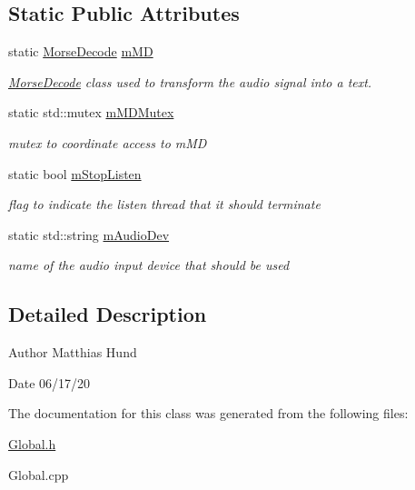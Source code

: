 \subsection*{Static Public Attributes}
\begin{DoxyCompactItemize}
\item 
\mbox{\label{classGlobal_acec01a6570ee9e7fcacb53e34f3e07d9}} 
static \hyperlink{classMorseDecode}{Morse\+Decode} \hyperlink{classGlobal_acec01a6570ee9e7fcacb53e34f3e07d9}{m\+MD}
\begin{DoxyCompactList}\small\item\em \hyperlink{classMorseDecode}{Morse\+Decode} class used to transform the audio signal into a text. \end{DoxyCompactList}\item 
\mbox{\label{classGlobal_a381fdad9f072fbfc884f5fd21770c01d}} 
static std\+::mutex \hyperlink{classGlobal_a381fdad9f072fbfc884f5fd21770c01d}{m\+M\+D\+Mutex}
\begin{DoxyCompactList}\small\item\em mutex to coordinate access to m\+MD \end{DoxyCompactList}\item 
\mbox{\label{classGlobal_a8b6e4fdee334448daa515c479f811c16}} 
static bool \hyperlink{classGlobal_a8b6e4fdee334448daa515c479f811c16}{m\+Stop\+Listen}
\begin{DoxyCompactList}\small\item\em flag to indicate the listen thread that it should terminate \end{DoxyCompactList}\item 
\mbox{\label{classGlobal_af3946aac777799a0d5c1df0a7a5abcdb}} 
static std\+::string \hyperlink{classGlobal_af3946aac777799a0d5c1df0a7a5abcdb}{m\+Audio\+Dev}
\begin{DoxyCompactList}\small\item\em name of the audio input device that should be used \end{DoxyCompactList}\end{DoxyCompactItemize}


\subsection{Detailed Description}
\begin{DoxyAuthor}{Author}
Matthias Hund 
\end{DoxyAuthor}
\begin{DoxyDate}{Date}
06/17/20 
\end{DoxyDate}


The documentation for this class was generated from the following files\+:\begin{DoxyCompactItemize}
\item 
\hyperlink{Global_8h}{Global.\+h}\item 
Global.\+cpp\end{DoxyCompactItemize}
